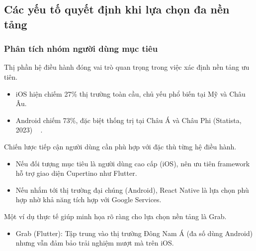 \subsection{Các yếu tố quyết định khi lựa chọn đa nền tảng}
\renewcommand{\labelitemi}{--}    
\begin{flushleft}

  \subsubsection{Phân tích nhóm người dùng mục tiêu}
    \begin{flushleft}
      \hspace*{0.8cm}Thị phần hệ điều hành đóng vai trò quan trọng trong việc xác định nền tảng ưu tiên.
      \setlength{\leftmargini}{1.5cm}
      \begin{itemize}
        \item iOS hiện chiếm 27\% thị trường toàn cầu, chủ yếu phổ biến tại Mỹ và Châu Âu.
        \item Android chiếm 73\%, đặc biệt thống trị tại Châu Á và Châu Phi (Statista, 2023) ~\cite{biornhansen2021} .
      \end{itemize}
    \end{flushleft}

    \begin{flushleft}
      \hspace*{0.8cm}Chiến lược tiếp cận người dùng cần phù hợp với đặc thù từng hệ điều hành.
      \setlength{\leftmargini}{1.5cm}
      \begin{itemize}
          \item Nếu đối tượng mục tiêu là người dùng cao cấp (iOS), nên ưu tiên framework hỗ trợ giao diện Cupertino như Flutter.
          \item Nếu nhắm tới thị trường đại chúng (Android), React Native là lựa chọn phù hợp nhờ khả năng tích hợp với Google Services.
      \end{itemize}
    \end{flushleft}

    \begin{flushleft}
      \hspace*{0.8cm}Một ví dụ thực tế giúp minh họa rõ ràng cho lựa chọn nền tảng là Grab.
      \setlength{\leftmargini}{1.5cm}
      \begin{itemize}
          \item Grab (Flutter): Tập trung vào thị trường Đông Nam Á (đa số dùng Android) nhưng vẫn đảm bảo trải nghiệm mượt mà trên iOS.
      \end{itemize}
    \end{flushleft}


\end{flushleft}

